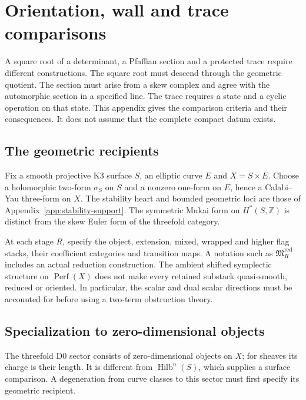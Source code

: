 \section{Orientation, wall and trace comparisons}
\label{app:obstruction-discharges}

A square root of a determinant, a Pfaffian section and a protected
trace require different constructions. The square root must descend
through the geometric quotient. The section must arise from a skew
complex and agree with the automorphic section in a specified line.
The trace requires a state and a cyclic operation on that state.
This appendix gives the comparison criteria and their consequences.
It does not assume that the complete compact datum exists.

\subsection{The geometric recipients}
\label{app:G-setup}

Fix a smooth projective K3 surface \(S\), an elliptic curve \(E\)
and \(X=S\times E\). Choose a holomorphic two-form \(\sigma_S\)
on \(S\) and a nonzero one-form on \(E\), hence a Calabi--Yau
three-form on \(X\). The stability heart and bounded geometric
loci are those of Appendix~\ref{app:stability-support}.
The symmetric Mukai form on \(H^*(S,\mathbb Z)\) is distinct
from the skew Euler form of the threefold category.

At each stage \(R\), specify the object, extension, mixed, wrapped
and higher flag stacks, their coefficient categories and transition
maps. A notation such as \(\mathfrak M_R^{\mathrm{red}}\)
includes an actual reduction construction. The ambient shifted
symplectic structure on \(\operatorname{Perf}(X)\) does not make
every retained substack quasi-smooth, reduced or oriented.
In particular, the scalar and dual scalar directions must be
accounted for before using a two-term obstruction theory.

\subsection{Specialization to zero-dimensional objects}
\label{app:G-D0-discharge}

The threefold D0 sector consists of zero-dimensional objects on
\(X\); for sheaves its charge is their length. It is different
from \(\operatorname{Hilb}^n(S)\), which supplies a surface
comparison. A degeneration from curve classes to this sector must
first specify its geometric recipient.

